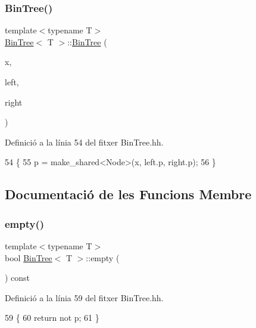 \subsubsection{\texorpdfstring{Bin\+Tree()}{BinTree()}\hspace{0.1cm}{\footnotesize\ttfamily [3/3]}}
{\footnotesize\ttfamily template$<$typename T$>$ \\
\hyperlink{class_bin_tree}{Bin\+Tree}$<$ T $>$\+::\hyperlink{class_bin_tree}{Bin\+Tree} (\begin{DoxyParamCaption}\item[{const T \&}]{x,  }\item[{const \hyperlink{class_bin_tree}{Bin\+Tree}$<$ T $>$ \&}]{left,  }\item[{const \hyperlink{class_bin_tree}{Bin\+Tree}$<$ T $>$ \&}]{right }\end{DoxyParamCaption})\hspace{0.3cm}{\ttfamily [explicit]}}



Definició a la línia 54 del fitxer Bin\+Tree.\+hh.


\begin{DoxyCode}
54                                                                              \{
55         p = make\_shared<Node>(x, left.p, right.p);
56     \}
\end{DoxyCode}


\subsection{Documentació de les Funcions Membre}
\mbox{\label{class_bin_tree_a74cda259ba5c25b8ee38ed4dc33e4fad}} 
\subsubsection{\texorpdfstring{empty()}{empty()}}
{\footnotesize\ttfamily template$<$typename T$>$ \\
bool \hyperlink{class_bin_tree}{Bin\+Tree}$<$ T $>$\+::empty (\begin{DoxyParamCaption}{ }\end{DoxyParamCaption}) const}



Definició a la línia 59 del fitxer Bin\+Tree.\+hh.


\begin{DoxyCode}
59                         \{
60         \textcolor{keywordflow}{return} not p;
61     \}
\end{DoxyCode}
\mbox{\label{class_bin_tree_a82108db4c1b08d1f111027788c196d4e}} 
